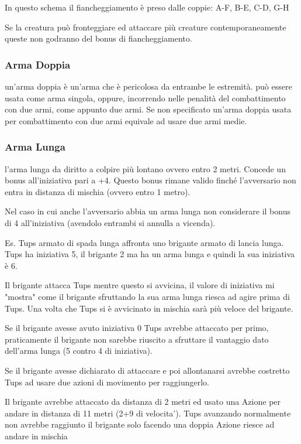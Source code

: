 \documentclass[a4paper,11pt,twoside,openany]{book}
\begin{document}
In questo schema il fiancheggiamento è preso dalle coppie: A-F, B-E, C-D, G-H

\bigskip

Se la creatura può fronteggiare ed attaccare più creature contemporaneamente queste non godranno del bonus di fiancheggiamento.

\subsubsection{Arma Doppia} un'arma doppia è un'arma che è pericolosa da entrambe le estremità. può essere usata come arma singola, oppure, incorrendo nelle penalità del combattimento con due armi, come appunto due armi. Se non specificato un'arma doppia usata per combattimento con due armi equivale ad usare due armi medie.

\subsubsection{Arma Lunga} l'arma lunga da diritto a colpire più lontano ovvero entro 2 metri. Concede un bonus all'iniziativa pari a +4. Questo bonus rimane valido finché l'avversario non entra in distanza di mischia (ovvero entro 1 metro).

Nel caso in cui anche l'avversario abbia un arma lunga non considerare il bonus di 4 all'iniziativa (avendolo entrambi si annulla a vicenda).

Es. Tups armato di spada lunga affronta uno brigante armato di lancia lunga. Tups ha iniziativa 5, il brigante 2 ma ha un arma lunga e quindi la sua iniziativa è 6.

Il brigante attacca Tups mentre questo si avvicina, il valore di iniziativa mi "mostra" come il brigante sfruttando la sua arma lunga riesca ad agire prima di Tups. Una volta che Tups si è avvicinato in mischia sarà più veloce del brigante.

Se il brigante avesse avuto iniziativa 0 Tups avrebbe attaccato per primo, praticamente il brigante non sarebbe riuscito a sfruttare il vantaggio dato dell'arma lunga (5 contro 4 di iniziativa).

Se il brigante avesse dichiarato di attaccare e poi allontanarsi avrebbe costretto Tups ad usare due azioni di movimento per raggiungerlo.

Il brigante avrebbe attaccato da distanza di 2 metri ed usato una Azione per andare in distanza di 11 metri (2+9 di velocita'). Tups avanzando normalmente non avrebbe raggiunto il brigante solo facendo una doppia Azione riesce ad andare in mischia
\end{document}

